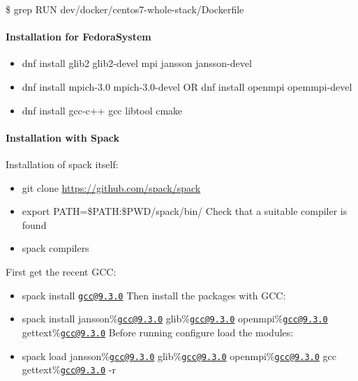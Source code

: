 \$ grep RUN dev/docker/centos7-whole-stack/Dockerfile

\paragraph{Installation for FedoraSystem}%
\label{installation-for-fedora-system}

\begin{itemize}
  \item dnf install glib2 glib2-devel mpi jansson jansson-devel
  \item dnf install mpich-3.0 mpich-3.0-devel OR dnf install openmpi
    opemmpi-devel
  \item dnf install gcc-c++ gcc libtool cmake
\end{itemize}

\paragraph{Installation with Spack}%
\label{installation-with-spack}

Installation of spack itself:

\begin{itemize}
  \item git clone \url{https://github.com/spack/spack}
  \item export PATH=\$PATH:\$PWD/spack/bin/ Check that a suitable compiler is
    found
  \item spack compilers
\end{itemize}

First get the recent GCC:

\begin{itemize}
  \item spack install \href{mailto:gcc@9.3.0}{\nolinkurl{gcc@9.3.0}} Then
    install the packages with GCC:
  \item spack install jansson\%\href{mailto:gcc@9.3.0}{\nolinkurl{gcc@9.3.0}}
    glib\%\href{mailto:gcc@9.3.0}{\nolinkurl{gcc@9.3.0}}
    openmpi\%\href{mailto:gcc@9.3.0}{\nolinkurl{gcc@9.3.0}}
    gettext\%\href{mailto:gcc@9.3.0}{\nolinkurl{gcc@9.3.0}} Before running
    configure load the modules:
  \item spack load jansson\%\href{mailto:gcc@9.3.0}{\nolinkurl{gcc@9.3.0}}
    glib\%\href{mailto:gcc@9.3.0}{\nolinkurl{gcc@9.3.0}}
    openmpi\%\href{mailto:gcc@9.3.0}{\nolinkurl{gcc@9.3.0}} gcc
    gettext\%\href{mailto:gcc@9.3.0}{\nolinkurl{gcc@9.3.0}} -r
\end{itemize}

